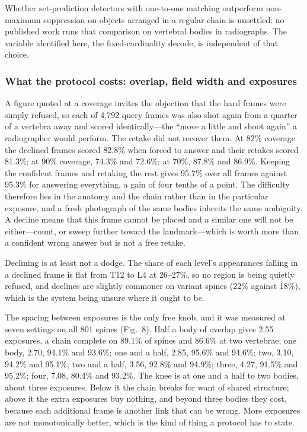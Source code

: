 \documentclass[11pt,letterpaper]{article}
\begin{document}
Whether set-prediction detectors with one-to-one matching outperform non-maximum suppression on objects arranged in a regular chain is unsettled: no published work runs that comparison on vertebral bodies in radiographs. The variable identified here, the fixed-cardinality decode, is independent of that choice.


\subsubsection*{What the protocol costs: overlap, field width and exposures}
A figure quoted at a coverage invites the objection that the hard frames were simply refused, so each of 4,792 query frames was also shot again from a quarter of a vertebra away and scored identically---the ``move a little and shoot again'' a radiographer would perform. The retake did not recover them. At 82\% coverage the declined frames scored 82.8\% when forced to answer and their retakes scored 81.3\%; at 90\% coverage, 74.3\% and 72.6\%; at 70\%, 87.8\% and 86.9\%. Keeping the confident frames and retaking the rest gives 95.7\% over all frames against 95.3\% for answering everything, a gain of four tenths of a point. The difficulty therefore lies in the anatomy and the chain rather than in the particular exposure, and a fresh photograph of the same bodies inherits the same ambiguity. A decline means that this frame cannot be placed and a similar one will not be either---count, or sweep further toward the landmark---which is worth more than a confident wrong answer but is not a free retake.

Declining is at least not a dodge. The share of each level's appearances falling in a declined frame is flat from T12 to L4 at 26--27\%, so no region is being quietly refused, and declines are slightly commoner on variant spines (22\% against 18\%), which is the system being unsure where it ought to be.

The spacing between exposures is the only free knob, and it was measured at seven settings on all 801 spines (Fig.~8). Half a body of overlap gives 2.55 exposures, a chain complete on 89.1\% of spines and 86.6\% at two vertebrae; one body, 2.70, 94.1\% and 93.6\%; one and a half, 2.85, 95.6\% and 94.6\%; two, 3.10, 94.2\% and 95.1\%; two and a half, 3.56, 92.8\% and 94.9\%; three, 4.27, 91.5\% and 95.2\%; four, 7.08, 80.4\% and 93.2\%. The knee is at one and a half to two bodies, about three exposures. Below it the chain breaks for want of shared structure; above it the extra exposures buy nothing, and beyond three bodies they cost, because each additional frame is another link that can be wrong. More exposures are not monotonically better, which is the kind of thing a protocol has to state.
\end{document}
